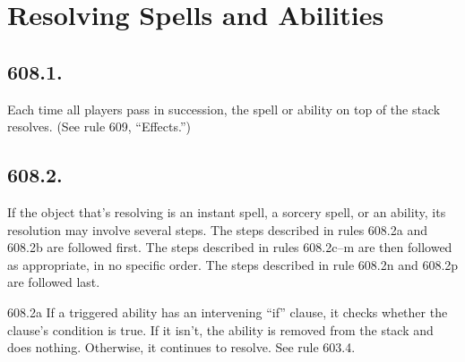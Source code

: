 \section{Resolving Spells and Abilities}
\subsection*{608.1.}
Each time all players pass in succession, the spell or ability on top of the stack resolves. (See rule 609, “Effects.”)

\subsection*{608.2.}
If the object that’s resolving is an instant spell, a sorcery spell, or an ability, its resolution may involve several steps. The steps described in rules 608.2a and 608.2b are followed first. The steps described in rules 608.2c–m are then followed as appropriate, in no specific order. The steps described in rule 608.2n and 608.2p are followed last.

608.2a If a triggered ability has an intervening “if” clause, it checks whether the clause’s condition is true. If it isn’t, the ability is removed from the stack and does nothing. Otherwise, it continues to resolve. See rule 603.4.


